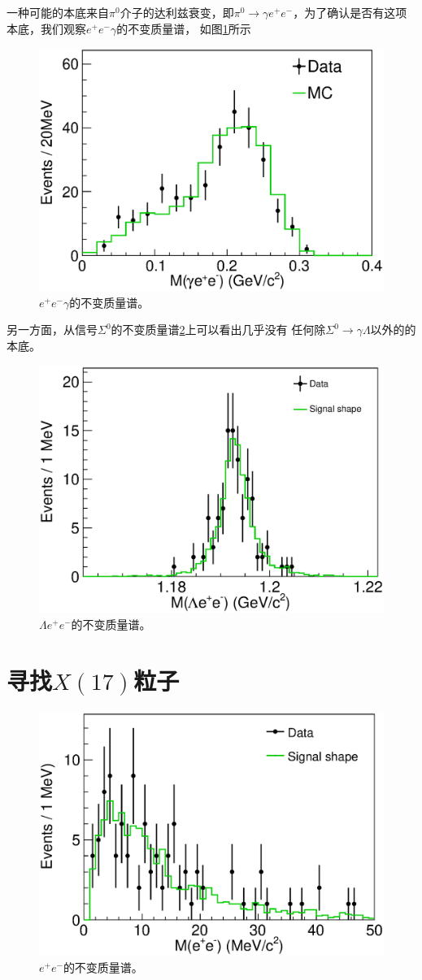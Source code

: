 一种可能的本底来自$\pi^{0}$介子的达利兹衰变，即$\pi^{0} \to \gamma e^{+}
e^{-}$，为了确认是否有这项本底，我们观察$e^{+}e^{-}\gamma$的不变质量谱，
如图\ref{fig:meeg-sigma0Decay}所示
\begin{figure}[htpb]
    \centering
    \includegraphics[width=0.8\linewidth]{figures/Sigma/eve/mPi0.eps}
    \caption{%
        $e^{+}e^{-}\gamma$的不变质量谱。
    }%
    \label{fig:meeg-sigma0Decay}
\end{figure}
另一方面，从信号$\Sigma^{0}$的不变质量谱\ref{fig:mSignal}上可以看出几乎没有
任何除$\Sigma^{0} \to \gamma \Lambda$以外的的本底。
\begin{figure}[htpb]
    \centering
    \includegraphics[width=0.8\linewidth]{figures/Sigma/eve/mSignal.eps}
    \caption{$\Lambda e^{+} e^{-}$的不变质量谱。}%
    \label{fig:mSignal}
\end{figure}

\section{寻找$X(17)$粒子}
\begin{figure}[htpb]
    \centering
    \includegraphics[width=0.8\linewidth]{figures/Sigma/eve/mEE.eps}
    \caption{$e^{+} e^{-}$的不变质量谱。}%
    \label{fig:mEE}
\end{figure}

